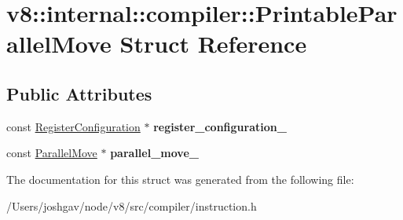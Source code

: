 \hypertarget{structv8_1_1internal_1_1compiler_1_1_printable_parallel_move}{}\section{v8\+:\+:internal\+:\+:compiler\+:\+:Printable\+Parallel\+Move Struct Reference}
\label{structv8_1_1internal_1_1compiler_1_1_printable_parallel_move}
\subsection*{Public Attributes}
\begin{DoxyCompactItemize}
\item 
const \hyperlink{classv8_1_1internal_1_1_register_configuration}{Register\+Configuration} $\ast$ {\bfseries register\+\_\+configuration\+\_\+}\hypertarget{structv8_1_1internal_1_1compiler_1_1_printable_parallel_move_afe162d651b81cce8d59f5fdb6577abf3}{}\label{structv8_1_1internal_1_1compiler_1_1_printable_parallel_move_afe162d651b81cce8d59f5fdb6577abf3}

\item 
const \hyperlink{classv8_1_1internal_1_1compiler_1_1_parallel_move}{Parallel\+Move} $\ast$ {\bfseries parallel\+\_\+move\+\_\+}\hypertarget{structv8_1_1internal_1_1compiler_1_1_printable_parallel_move_aca16c4a4ebf0e2f4dda4d446ccf434ac}{}\label{structv8_1_1internal_1_1compiler_1_1_printable_parallel_move_aca16c4a4ebf0e2f4dda4d446ccf434ac}

\end{DoxyCompactItemize}


The documentation for this struct was generated from the following file\+:\begin{DoxyCompactItemize}
\item 
/\+Users/joshgav/node/v8/src/compiler/instruction.\+h\end{DoxyCompactItemize}
